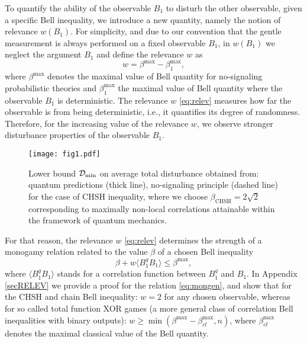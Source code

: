 \documentclass[pra,twocolumn,showpacs,preprintnumbers,amsmath,amssymb,superscriptaddress]{revtex4-1}
\def\be{\begin{equation}}
\def\ee{\end{equation}}
\def\>{\rangle}
\def\<{\langle}
\def\omeas{B_1}
\def\ogentle{B_1^g}
\def\chsh{\beta_{\text{CHSH}}}
\def\betaMax{\beta^{\max}}
\def\betaMaxcl{\beta^{\max}_{cl}}
\def\dist{{\cal D}}
\def\relev{w}
\begin{document}
To quantify the ability of the observable $\omeas$ to disturb the other observable, given a specific Bell inequality, we introduce a new quantity, namely the notion of relevance $\relev(\omeas)$. For simplicity, and due to our convention that the gentle measurement is always performed on a fixed observable $\omeas$, in $\relev(\omeas)$ we neglect the argument  $\omeas$ and define the relevance $\relev$ as 
\be\label{eq:relev}
\relev= \betaMax - \betaMax_1, 
\ee
where $\betaMax$ denotes the maximal value of Bell quantity for no-signaling probabilistic theories and $\betaMax_1$ the maximal value of Bell quantity where the observable $\omeas$ is deterministic. 
The relevance $\relev$  \eqref{eq:relev} measures how far the observable is from being deterministic, i.e., it quantifies its degree of randomness. Therefore, for the increasing value of the relevance $\relev$, we observe stronger disturbance properties of the observable $\omeas$. 

\begin{figure}
\centering
\texttt{[image: fig1.pdf]}
\caption{Lower bound $\dist_{\min}$ on average total disturbance obtained from: quantum predictions (thick line), no-signaling principle (dashed line) for the case of CHSH inequality, where we choose $\chsh=2 \sqrt{2}$ corresponding to maximally non-local correlations attainable within the framework of quantum mechanics.}
\label{fig1}
\end{figure}

For that reason, the relevance $\relev$ \eqref{eq:relev} determines the strength of a  monogamy relation related to the value $\beta$ of a chosen Bell inequality
\be
\label{eq:mongen}
\beta + \relev \<\ogentle\omeas\> \leq \betaMax,
\ee
where $\<\ogentle\omeas\>$ stands for a correlation function between $\ogentle$ and $\omeas$. In Appendix \ref{secRELEV} we provide a proof for the relation \eqref{eq:mongen}, and show that for the CHSH and chain Bell inequality: $\relev= 2$ for any chosen observable, whereas for so called total function XOR games (a more general class of correlation Bell inequalities with binary outputs): $\relev\geq \min(\betaMax-\betaMaxcl, n)$, where $\betaMaxcl$ denotes the maximal classical value of the Bell quantity.
\end{document}
